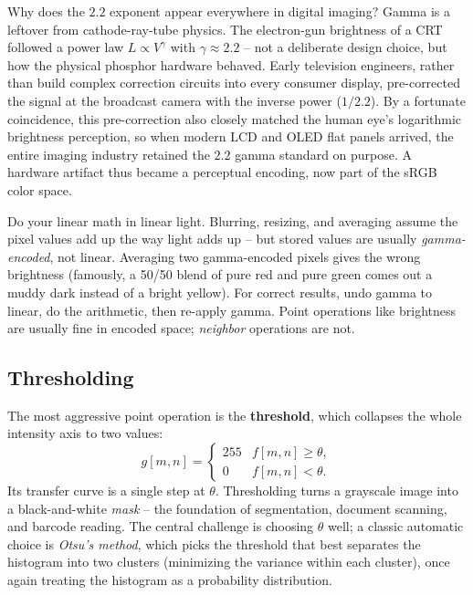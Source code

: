\begin{whybox}
Why does the $2.2$ exponent appear everywhere in digital imaging?
Gamma is a leftover from cathode-ray-tube physics. The electron-gun brightness of a
CRT followed a power law $L\propto V^{\gamma}$ with $\gamma\approx 2.2$ -- not a
deliberate design choice, but how the physical phosphor hardware behaved. Early
television engineers, rather than build complex correction circuits into every
consumer display, pre-corrected the signal at the broadcast camera with the inverse
power ($1/2.2$). By a fortunate coincidence, this pre-correction also closely matched
the human eye's logarithmic brightness perception, so when modern LCD and OLED flat panels
arrived, the entire imaging industry retained the $2.2$ gamma standard on purpose.
A hardware artifact thus became a perceptual encoding, now part of
the sRGB color space.
\end{whybox}

\begin{trapbox}
Do your linear math in linear light. Blurring, resizing, and averaging assume the
pixel values add up the way light adds up -- but stored values are usually
\emph{gamma-encoded}, not linear. Averaging two gamma-encoded pixels gives the
wrong brightness (famously, a 50/50 blend of pure red and pure green comes out a
muddy dark instead of a bright yellow). For correct results, undo gamma to linear,
do the arithmetic, then re-apply gamma. Point operations like brightness are
usually fine in encoded space; \emph{neighbor} operations are not.
\end{trapbox}

\subsection{Thresholding}
\label{ch30:threshold}

The most aggressive point operation is the \textbf{threshold}, which collapses
the whole intensity axis to two values:
\begin{equation}
\label{ch30:threshold-eq}
g[m,n] = \begin{cases} 255 & f[m,n] \ge \theta,\\ 0 & f[m,n] < \theta.\end{cases}
\end{equation}
Its transfer curve is a single step at $\theta$. Thresholding turns a grayscale
image into a black-and-white \emph{mask} -- the foundation of segmentation,
document scanning, and barcode reading. The central challenge is choosing $\theta$ well;
a classic automatic choice is \emph{Otsu's method}, which picks the threshold that
best separates the histogram into two clusters (minimizing the variance within each cluster),
once again treating the histogram as a probability distribution.

